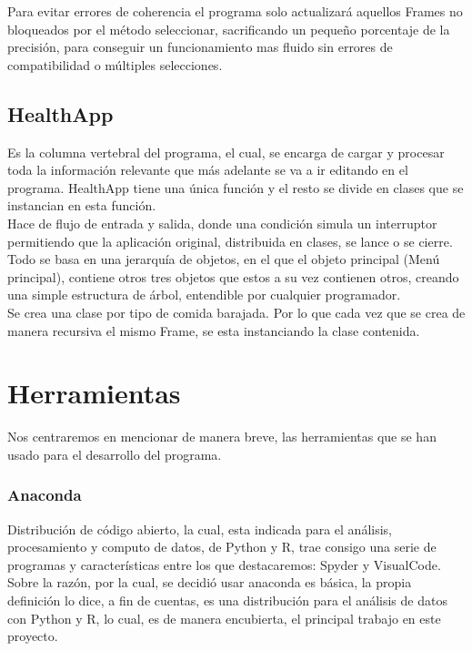 Para evitar errores de coherencia el programa solo actualizará aquellos Frames no bloqueados por el método seleccionar, sacrificando un pequeño porcentaje de la precisión, para conseguir un funcionamiento mas fluido sin errores de compatibilidad o múltiples selecciones.\\
\subsection{HealthApp}
Es la columna vertebral del programa, el cual, se encarga de cargar y procesar toda la información relevante que más adelante se va a ir editando en el programa. HealthApp tiene una única función y el resto se divide en clases que se instancian en esta función.\\

Hace de flujo de entrada y salida, donde una condición simula un interruptor permitiendo que la aplicación original, distribuida en clases, se lance o se cierre.\\

Todo se basa en una  jerarquía de objetos, en el que el objeto principal (Menú principal), contiene otros tres objetos que estos a su vez contienen otros, creando una simple estructura de árbol, entendible por cualquier programador. \\

Se crea una clase por tipo de comida barajada. Por lo que cada vez que se crea de manera recursiva el mismo Frame, se esta instanciando la clase contenida.

\section{Herramientas}
 Nos centraremos en mencionar de manera breve, las herramientas que se han usado para el desarrollo del programa.
\subsubsection{Anaconda}
Distribución de código abierto, la cual, esta indicada para el análisis, procesamiento y computo de datos, de Python y R, trae consigo una serie de programas y características entre los que destacaremos: Spyder y VisualCode.\\

Sobre la razón, por la cual, se decidió usar anaconda es básica, la propia definición lo dice, a fin de cuentas, es una distribución para el análisis de datos con Python y R, lo cual, es de manera encubierta, el principal trabajo en este proyecto.

